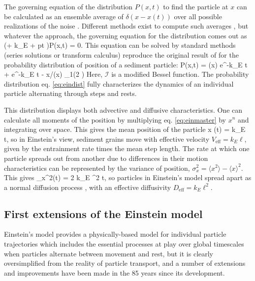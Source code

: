 The governing equation of the distribution $P(x,t)$ to find the particle at $x$ can be calculated as an ensemble average of $\delta(x-x(t))$ over all possible realizations of the noise \citep{Risken1984,Moss1989}. Different methods exist to compute such averages \citep{Hanggi1978, Hanggi1984, Balakrishnan1993, VanDenBroeck1983}, but whatever the approach, the governing equation for the distribution comes out as
\be  \big(\ell \px \pt + k_E \ell \px + pt \big)P(x,t) = 0. \label{eq:einmaster}\ee
This equation can be solved by standard methods (series solutions or transform calculus) \citep{Arfken1985,Prudnikov1986a} reproduce the original result of \citet{Einstein1937} for the probability distribution of position of a sediment particle:
\be P(x,t) = \delta(x) e^{-k_E t} + e^{-k_E t - x/\ell}\theta(x) _1\Big(2 \Big) \ee
Here, $\mathcal{I}$ is a modified Bessel function. 
The probability distribution eq. \ref{eq:eindist} fully characterizes the dynamics of an individual particle alternating through steps and rests. 

This distribution displays both advective and diffusive characteristics.
One can calculate all moments of the position by multiplying eq. \ref{eq:einmaster} by $x^n$ and integrating over space. This gives the mean position of the particle
\be \langle x \rangle (t) = k_E \ell t, \ee
so in Einstein's view, sediment grains move with effective velocity $V_\text{eff} = k_E \ell$, given by the entrainment rate times the mean step length.
The rate at which one particle spreads out from another due to differences in their motion characteristics can be represented by the variance of position, $\sigma_x^2  = \langle x^2 \rangle - \langle x \rangle^2$. This gives
\be \sigma_x^2(t) = 2 k_E \ell^2 t, \ee
so particles in Einstein's model spread apart as a normal diffusion process \citep{Sokolev2002}, with an effective diffusivity $D_\text{eff} = k_E \ell^2.$

\subsection{First extensions of the Einstein model}

Einstein's model provides a physically-based model for individual particle trajectories which includes the essential processes at play over global timescales when particles alternate between movement and rest, but it is clearly oversimplified from the reality of particle transport, and a number of extensions and improvements have been made in the 85 years since its development.

